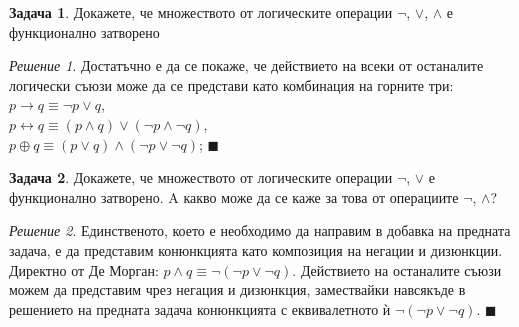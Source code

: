 \documentclass[10pt, a4paper]{article}
\theoremstyle{definition}
\newtheorem{problem}{Задача}
\theoremstyle{remark}
\newtheorem*{sol}{Решение}
\begin{document}
\begin{problem}
Докажете, че множеството от логическите операции \(\neg\), \(\vee\), \(\wedge\) е функционално затворено
\end{problem}
\begin{sol}
    Достатъчно е да се покаже, че действието на всеки от останалите логически съюзи може да се представи като комбинация на горните три:\\
    \(p\rightarrow q \equiv \neg p\vee q\),\\
    \(p\leftrightarrow q \equiv (p \wedge q) \vee (\neg p \wedge \neg q)\),\\
    \(p\oplus q \equiv (p \vee q) \wedge (\neg p \vee \neg q)\); \(\blacksquare\)
\end{sol}

\hfill
\begin{problem}
Докажете, че множеството от логическите операции \(\neg\), \(\vee\) е функционално затворено. A какво може да се каже за това от операциите \(\neg\), \(\wedge\)?
\end{problem}
\begin{sol}
    Единственото, което е необходимо да направим в добавка на предната задача, е да представим конюнкцията като композиция на негации и дизюнкции. Директно от Де Морган: \(p\wedge q\equiv \neg(\neg p\vee\neg q)\). Действието на останалите съюзи можем да представим чрез негация и дизюнкция, замествайки навсякъде в решението на предната задача конюнкцията с еквивалетното ѝ \(\neg(\neg p\vee\neg q)\). \(\blacksquare\)
\end{sol}
\end{document}
